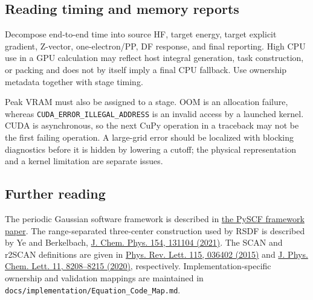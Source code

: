 \subsection{Reading timing and memory reports}

Decompose end-to-end time into source HF, target energy, target explicit
gradient, Z-vector, one-electron/PP, DF response, and final reporting.  High
CPU use in a GPU calculation may reflect host integral generation, task
construction, or packing and does not by itself imply a final CPU fallback.
Use ownership metadata together with stage timing.

Peak VRAM must also be assigned to a stage.  OOM is an allocation failure,
whereas \texttt{CUDA\_ERROR\_ILLEGAL\_ADDRESS} is an invalid access by a
launched kernel.  CUDA is asynchronous, so the next CuPy operation in a
traceback may not be the first failing operation.  A large-grid error should
be localized with blocking diagnostics before it is hidden by lowering a
cutoff; the physical representation and a kernel limitation are separate
issues.

\subsection{Further reading}

The periodic Gaussian software framework is described in
\href{https://doi.org/10.1002/wcms.1340}{the PySCF framework paper}.  The
range-separated three-center construction used by RSDF is described by Ye
and Berkelbach,
\href{https://doi.org/10.1063/5.0046617}{J. Chem. Phys. 154, 131104 (2021)}.
The SCAN and r2SCAN definitions are given in
\href{https://doi.org/10.1103/PhysRevLett.115.036402}{Phys. Rev. Lett. 115,
036402 (2015)} and
\href{https://doi.org/10.1021/acs.jpclett.0c02405}{J. Phys. Chem. Lett. 11,
8208--8215 (2020)}, respectively.  Implementation-specific ownership and
validation mappings are maintained in
\texttt{docs/implementation/Equation\_Code\_Map.md}.
